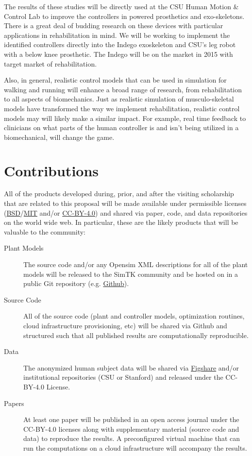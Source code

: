\documentclass[11pt]{article}
\begin{document}
The results of these studies will be directly used at the CSU Human Motion \&
Control Lab to improve the controllers in powered prosthetics and
exo-skeletons.  There is a great deal of budding research on these devices with
particular applications in rehabilitation in mind. We will be working to
implement the identified controllers directly into the Indego exoskeleton and
CSU's leg robot with a below knee prosthetic. The Indego will be on the market
in 2015 with target market of rehabilitation.

Also, in general, realistic control models that can be used in simulation for
walking and running will enhance a broad range of research, from rehabilitation
to all aspects of biomechanics. Just as realistic simulation of
musculo-skeletal models have transformed the way we implement rehabilitation,
realistic control models may will likely make a similar impact. For example,
real time feedback to clinicians on what parts of the human controller is and
isn't being utilized in a biomechanical, will change the game.

\section*{Contributions}

All of the products developed during, prior, and after the visiting scholarship
that are related to this proposal will be made available under permissible
licenses
(\href{http://opensource.org/licenses/BSD-2-Clause}{BSD}/\href{http://opensource.org/licenses/MIT}{MIT}
and/or \href{http://creativecommons.org/licenses/by/4.0/}{CC-BY-4.0}) and
shared via paper, code, and data repositories on the world wide web. In
particular, these are the likely products that will be valuable to the
community:

\begin{description}
  \item[Plant Models] The source code and/or any Opensim XML descriptions for
    all of the plant models will be released to the SimTK community and be
    hosted on in a public Git repository (e.g.
    \href{http://github.com}{Github}).
  \item[Source Code] All of the source code (plant and controller models,
    optimization routines, cloud infrastructure provisioning, etc) will be
    shared via Github and structured such that all published results are
    computationally reproducible.
  \item[Data] The anonymized human subject data will be shared via
    \href{http://figshare.com}{Figshare} and/or institutional repositories (CSU
    or Stanford) and released under the CC-BY-4.0 License.
  \item[Papers] At least one paper will be published in an open access journal
    under the CC-BY-4.0 licenses along with supplementary material (source code
    and data) to reproduce the results. A preconfigured virtual machine that
    can run the computations on a cloud infrastructure will accompany the
    results.
\end{description}
\end{document}
